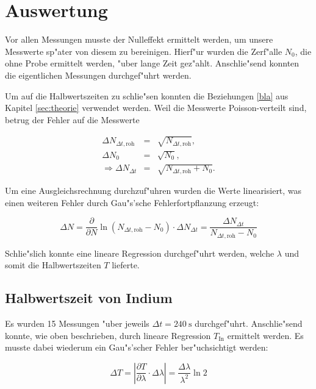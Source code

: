 \section{Auswertung}
	\label{sec:auswertung}
	Vor allen Messungen musste der Nulleffekt ermittelt werden, um unsere Messwerte sp"ater von diesem zu bereinigen.
	Hierf"ur wurden die Zerf"alle $N_0$, die ohne Probe ermittelt werden, "uber lange Zeit gez"ahlt.
	Anschlie"send konnten die eigentlichen Messungen durchgef"uhrt werden.
	

	Um auf die Halbwertszeiten zu schlie"sen konnten die Beziehungen \eqref{bla} aus Kapitel \ref{sec:theorie} verwendet werden.
	Weil die Messwerte Poisson-verteilt sind, betrug der Fehler auf die Messwerte

	\begin{eqnarray}
		\Delta N_{\Delta t, \mathrm{roh}} & = & \sqrt{N_{\Delta t, \mathrm{roh}}}, \\
		\Delta N_0 & = & \sqrt{N_0},\\
		\Rightarrow \Delta N_{\Delta t} & = & \sqrt{N_{\Delta t, \mathrm{roh}} + N_0}.
	\end{eqnarray}

	Um eine Ausgleichsrechnung durchzuf"uhren wurden die Werte linearisiert, was einen weiteren Fehler durch Gau"s'sche Fehlerfortpflanzung erzeugt:

	\begin{equation}
		\Delta N = \frac{\partial}{\partial N} \ln{\left( N_{\Delta t, \mathrm{roh}} - N_0 \right)} \cdot \Delta N_{\Delta t} = \frac{\Delta N_{\Delta t}}{N_{\Delta t, \mathrm{roh}} - N_0}
	\end{equation}

	Schlie"slich konnte eine lineare Regression durchgef"uhrt werden, welche $\lambda$ und somit die Halbwertszeiten $T$ lieferte.

	\subsection{Halbwertszeit von Indium}
		\label{subsec:indium}
		Es wurden 15 Messungen "uber jeweils $\Delta t = \SI{240}{\second}$ durchgef"uhrt.
		Anschlie"send konnte, wie oben beschrieben, durch lineare Regression $T_\mathrm{In}$ ermittelt werden. Es musste dabei wiederum ein Gau"s'scher Fehler ber"uchsichtigt werden:

		\begin{equation}
			\Delta T = \left|\frac{\partial T}{\partial \lambda} \cdot \Delta \lambda \right| = \frac{\Delta \lambda}{\lambda^2} \ln{2}
		\end{equation}


